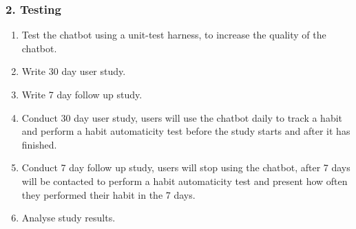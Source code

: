 \subsubsection*{2. Testing}

\begin{enumerate}
 \item Test the chatbot using a unit-test harness, to increase the quality of the chatbot.
 \item Write 30 day user study.
 \item Write 7 day follow up study.
 \item Conduct 30 day user study, users will use the chatbot daily to track a habit and perform a habit automaticity test before the study starts and after it has finished.
 \item Conduct 7 day follow up study, users will stop using the chatbot, after 7 days will be contacted to perform a habit automaticity test and present how often they performed their habit in the 7 days.
 \item Analyse study results.
\end{enumerate}


